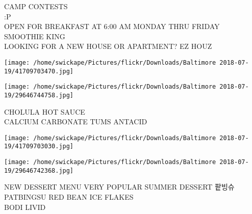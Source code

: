 \documentclass[10pt,letterpaper]{article}
\begin{document}
CAMP CONTESTS\\
:P\\
OPEN FOR BREAKFAST AT 6:00 AM MONDAY THRU FRIDAY SMOOTHIE KING\\
LOOKING FOR A NEW HOUSE OR APARTMENT?  EZ HOUZ
\pagebreak

\texttt{[image: /home/swickape/Pictures/flickr/Downloads/Baltimore 2018-07-19/41709703470.jpg]}

\vspace{0.25in}
\texttt{[image: /home/swickape/Pictures/flickr/Downloads/Baltimore 2018-07-19/29646744758.jpg]}

CHOLULA HOT SAUCE\\
CALCIUM CARBONATE TUMS ANTACID
\pagebreak

\texttt{[image: /home/swickape/Pictures/flickr/Downloads/Baltimore 2018-07-19/41709703030.jpg]}

\vspace{0.25in}
\texttt{[image: /home/swickape/Pictures/flickr/Downloads/Baltimore 2018-07-19/29646742368.jpg]}

NEW DESSERT MENU VERY POPULAR SUMMER DESSERT 팥빙슈 PATBINGSU RED BEAN ICE FLAKES\\
BODI LIVID
\pagebreak
\end{document}
